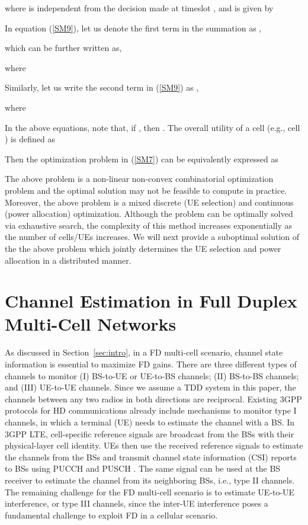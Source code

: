 \documentclass[journal]{IEEEtran}
\begin{document}
where  is independent from the decision made at timeslot , and is given by


In equation (\ref{SM9}), let us denote the first term in the summation as ,

which can be further written as,

where


Similarly, let us write the second term in (\ref{SM9}) as ,

where


In the above equations, note that, if , then . The overall utility of a cell (e.g., cell ) is defined as


Then the optimization problem in (\ref{SM7}) can be equivalently expressed as


The above problem is a non-linear non-convex combinatorial optimization problem and the optimal solution may not be feasible to compute in practice. Moreover, the above problem is a mixed discrete (UE selection) and continuous (power allocation) optimization. Although the problem can be optimally solved via exhaustive search, the complexity of this method increases exponentially as the number of cells/UEs increases. We will next provide a suboptimal solution of the the above problem which jointly determines the UE selection and power allocation in a distributed manner. 

\section{Channel Estimation in Full Duplex Multi-Cell Networks}\label{sec:CEP}
As discussed in Section~{\ref{sec:intro}}, in a FD multi-cell scenario, channel state information is essential to maximize FD gains. There are three different types of channels to monitor (I) BS-to-UE or UE-to-BS channels; (II) BS-to-BS channels; and (III) UE-to-UE channels. Since we assume a TDD system in this paper, the channels between any two radios in both directions are reciprocal. Existing 3GPP protocols for HD communications already include mechanisms to monitor type I channels, in which a terminal (UE) needs to estimate the channel with a BS. In 3GPP LTE, cell-specific reference signals are broadcast from the BSs with their physical-layer cell identity. UEs then use the received reference signals to estimate the channels from the BSs and transmit channel state information (CSI) reports to BSs using PUCCH and PUSCH \cite{DahlmanLTE}\cite{3GPP:5}. The same signal can be used at the BS receiver to estimate the channel from its neighboring BSs, i.e., type II channels. The remaining challenge for the FD multi-cell scenario is to estimate UE-to-UE interference, or type III channels, since the inter-UE interference poses a fundamental challenge to exploit FD in a cellular scenario. 
\end{document}
